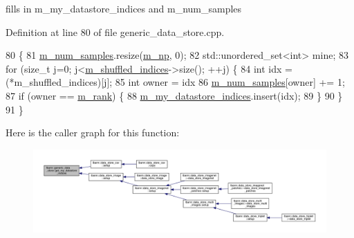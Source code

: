 fills in m\+\_\+my\+\_\+datastore\+\_\+indices and m\+\_\+num\+\_\+samples 



Definition at line 80 of file generic\+\_\+data\+\_\+store.\+cpp.


\begin{DoxyCode}
80                                                   \{
81   \hyperlink{classlbann_1_1generic__data__store_a17d6f931e1a2f4ae9e2452b7d47ead43}{m\_num\_samples}.resize(\hyperlink{classlbann_1_1generic__data__store_afcd4f99959c265c8c03dcf8ad3779d85}{m\_np}, 0);
82   std::unordered\_set<int> mine;
83   \textcolor{keywordflow}{for} (\textcolor{keywordtype}{size\_t} j=0; j<\hyperlink{classlbann_1_1generic__data__store_ad456f747ee07f63df15c60833dfb82ad}{m\_shuffled\_indices}->size(); ++j) \{
84     \textcolor{keywordtype}{int} idx = (*m\_shuffled\_indices)[j];
85     \textcolor{keywordtype}{int} owner = idx %
86     \hyperlink{classlbann_1_1generic__data__store_a17d6f931e1a2f4ae9e2452b7d47ead43}{m\_num\_samples}[owner] += 1;
87     \textcolor{keywordflow}{if} (owner == \hyperlink{classlbann_1_1generic__data__store_a87695bfd2d1ed0dbe01d99108e3f68b7}{m\_rank}) \{
88       \hyperlink{classlbann_1_1generic__data__store_abd38f8d8aab0648959e09d011abfe20a}{m\_my\_datastore\_indices}.insert(idx);
89     \}
90   \}
91 \}
\end{DoxyCode}
Here is the caller graph for this function\+:\nopagebreak
\begin{figure}[H]
\begin{center}
\leavevmode
\includegraphics[width=350pt]{classlbann_1_1generic__data__store_a3558f87939755b08ae151623a5799127_icgraph}
\end{center}
\end{figure}
\mbox{\label{classlbann_1_1generic__data__store_a53140adb8f7c2348986916a1abb85ffa}} 
